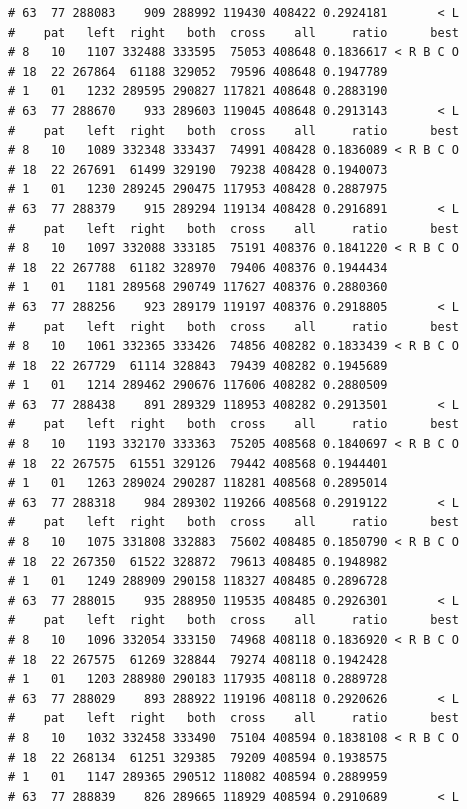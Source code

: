 \documentclass{article}\usepackage[]{graphicx}\usepackage[]{color}
\makeatletter
\newenvironment{kframe}{%
 \def\at@end@of@kframe{}%
 \ifinner\ifhmode%
  \def\at@end@of@kframe{\end{minipage}}%
  \begin{minipage}{\columnwidth}%
 \fi\fi%
 \def\FrameCommand##1{\hskip\@totalleftmargin \hskip-\fboxsep
 \colorbox{shadecolor}{##1}\hskip-\fboxsep
     \hskip-\linewidth \hskip-\@totalleftmargin \hskip\columnwidth}%
 \MakeFramed {\advance\hsize-\width
   \@totalleftmargin\z@ \linewidth\hsize
   \@setminipage}}%
 {\par\unskip\endMakeFramed%
 \at@end@of@kframe}
\newenvironment{knitrout}{}{} %
\makeatother
\begin{document}
\begin{knitrout}
\begin{kframe}
\begin{verbatim}
# 63  77 288083    909 288992 119430 408422 0.2924181       < L
#    pat   left  right   both  cross    all     ratio      best
# 8   10   1107 332488 333595  75053 408648 0.1836617 < R B C O
# 18  22 267864  61188 329052  79596 408648 0.1947789          
# 1   01   1232 289595 290827 117821 408648 0.2883190          
# 63  77 288670    933 289603 119045 408648 0.2913143       < L
#    pat   left  right   both  cross    all     ratio      best
# 8   10   1089 332348 333437  74991 408428 0.1836089 < R B C O
# 18  22 267691  61499 329190  79238 408428 0.1940073          
# 1   01   1230 289245 290475 117953 408428 0.2887975          
# 63  77 288379    915 289294 119134 408428 0.2916891       < L
#    pat   left  right   both  cross    all     ratio      best
# 8   10   1097 332088 333185  75191 408376 0.1841220 < R B C O
# 18  22 267788  61182 328970  79406 408376 0.1944434          
# 1   01   1181 289568 290749 117627 408376 0.2880360          
# 63  77 288256    923 289179 119197 408376 0.2918805       < L
#    pat   left  right   both  cross    all     ratio      best
# 8   10   1061 332365 333426  74856 408282 0.1833439 < R B C O
# 18  22 267729  61114 328843  79439 408282 0.1945689          
# 1   01   1214 289462 290676 117606 408282 0.2880509          
# 63  77 288438    891 289329 118953 408282 0.2913501       < L
#    pat   left  right   both  cross    all     ratio      best
# 8   10   1193 332170 333363  75205 408568 0.1840697 < R B C O
# 18  22 267575  61551 329126  79442 408568 0.1944401          
# 1   01   1263 289024 290287 118281 408568 0.2895014          
# 63  77 288318    984 289302 119266 408568 0.2919122       < L
#    pat   left  right   both  cross    all     ratio      best
# 8   10   1075 331808 332883  75602 408485 0.1850790 < R B C O
# 18  22 267350  61522 328872  79613 408485 0.1948982          
# 1   01   1249 288909 290158 118327 408485 0.2896728          
# 63  77 288015    935 288950 119535 408485 0.2926301       < L
#    pat   left  right   both  cross    all     ratio      best
# 8   10   1096 332054 333150  74968 408118 0.1836920 < R B C O
# 18  22 267575  61269 328844  79274 408118 0.1942428          
# 1   01   1203 288980 290183 117935 408118 0.2889728          
# 63  77 288029    893 288922 119196 408118 0.2920626       < L
#    pat   left  right   both  cross    all     ratio      best
# 8   10   1032 332458 333490  75104 408594 0.1838108 < R B C O
# 18  22 268134  61251 329385  79209 408594 0.1938575          
# 1   01   1147 289365 290512 118082 408594 0.2889959          
# 63  77 288839    826 289665 118929 408594 0.2910689       < L

\end{verbatim}
\end{kframe}
\end{knitrout}
\end{document}
